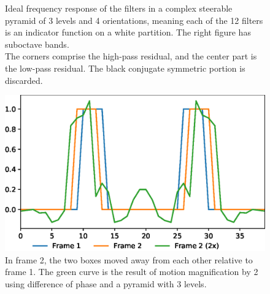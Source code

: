 \documentclass[aspectratio=43]{beamer}
\newcommand{\sidebysidecaption}[4]{%
\RaggedRight%
  \begin{minipage}[t]{#1}
    \vspace*{0pt}
    #3
  \end{minipage}
  \hfill%
  \begin{minipage}[t]{#2}
    \vspace*{0pt}
    #4
\end{minipage}%
}
\begin{document}
\begin{frame}[t]
\begin{multicols}{2}
\begin{figure}[tb]
{}{  \vspace{-0.3em}\caption{Ideal frequency response of the filters in a complex steerable pyramid of 3 levels and 4 orientations, meaning each of the 12 filters is an indicator function on a white partition. The right figure has suboctave bands.\\ \vspace{0.5em}
  The corners comprise the high-pass residual, and the center part is the low-pass residual. The black conjugate symmetric portion is discarded.
  }
}
\end{figure}

\vfill\break
\columnbreak



\begin{figure}[tb]
\sidebysidecaption{0.61\columnwidth}{0.39\columnwidth}{%
\includegraphics[scale=1.6]{example.eps}%
}{%
\vspace{-0.3em}  \caption{In frame 2, the two boxes moved away from each other relative to frame 1.  The green curve is the result of motion magnification by 2 using difference of phase and a pyramid with 3 levels.
  }
}
\end{figure}





\end{multicols}
\end{frame}
\end{document}
